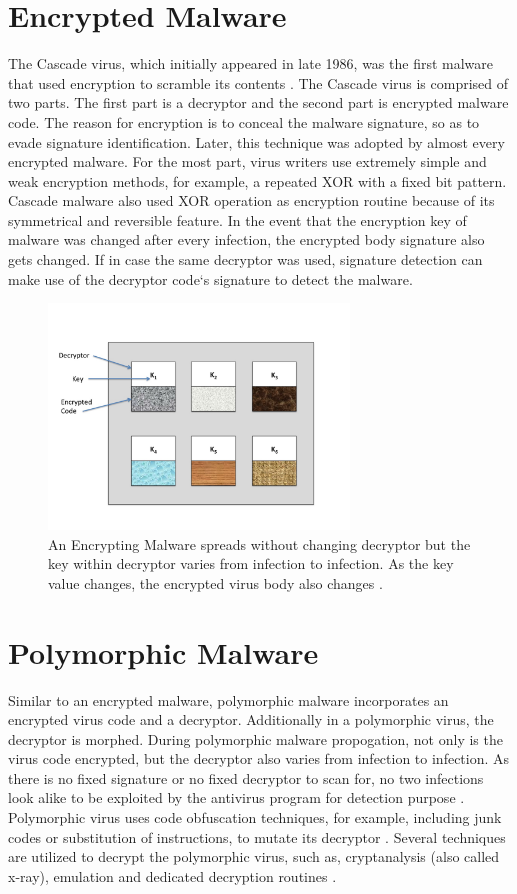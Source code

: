\section{Encrypted Malware} 

The Cascade virus, which initially appeared in late 1986, was the first malware that used encryption to scramble its contents \cite{bib11}. The Cascade virus is comprised of two parts. The first part is a decryptor and the second part is encrypted malware code. The reason for encryption is to conceal the malware signature, so as to evade signature identification. Later, this technique was adopted by almost every encrypted malware.  For the most part, virus writers use extremely simple and weak encryption methods, for example, a repeated XOR with a fixed bit pattern. Cascade malware also used XOR operation as encryption routine because of its symmetrical and reversible feature. In the event that the encryption key of malware was changed after every infection, the encrypted body signature also gets changed. If in case the same decryptor was used, signature detection can make use of the decryptor code`s signature to detect the malware.
\begin{figure}
    \centering    
    \includegraphics[width=8cm, height=6cm]{encryptedvirus.jpg}
    \caption[Encrypted Malware Replication]{An Encrypting Malware spreads without changing decryptor but the key within decryptor varies from infection to infection. As the key value changes, the encrypted virus body also changes \cite{bib14}.}
\end{figure}
\section{Polymorphic Malware} 

Similar to an encrypted malware, polymorphic malware incorporates an encrypted virus code and a decryptor. Additionally in a polymorphic virus, the decryptor is morphed. During polymorphic malware propogation, not only is the virus code encrypted, but the decryptor also varies from infection to infection. As there is no fixed signature or no fixed decryptor to scan for, no two infections look alike to be exploited by the antivirus program for detection purpose \cite{bib14}. Polymorphic virus uses code obfuscation techniques, for example, including junk codes or substitution of instructions, to mutate its decryptor \cite{bib18}.
Several techniques are utilized to decrypt the polymorphic virus, such as, cryptanalysis (also called x-ray), emulation and dedicated decryption routines \cite{bib21}.

